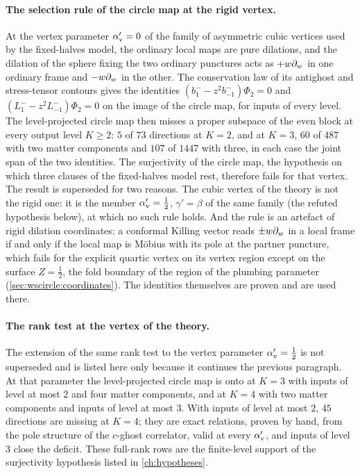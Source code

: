 \paragraph{The selection rule of the circle map at the rigid vertex.}
At the vertex parameter $\alpha'_{\rm v} = 0$ of the family of asymmetric cubic vertices used by the fixed-halves model, the ordinary local maps are pure dilations, and the dilation of the sphere fixing the two ordinary punctures acts as $+ w \partial_w$ in one ordinary frame and $- w \partial_w$ in the other.
The conservation law of its antighost and stress-tensor contours gives the identities $(b_1^- - z^2 b_{-1}^-) \Phi_2 = 0$ and $(L_1^- - z^2 L_{-1}^-) \Phi_2 = 0$ on the image of the circle map, for inputs of every level.
The level-projected circle map then misses a proper subspace of the even block at every output level $K \ge 2$: $5$ of $73$ directions at $K = 2$, and at $K = 3$, $60$ of $487$ with two matter components and $107$ of $1447$ with three, in each case the joint span of the two identities.
The surjectivity of the circle map, the hypothesis on which three clauses of the fixed-halves model rest, therefore fails for that vertex.
The result is superseded for two reasons.
The cubic vertex of the theory is not the rigid one: it is the member $\alpha'_{\rm v} = \tfrac{1}{2}$, $\gamma' = \beta$ of the same family (the refuted hypothesis below), at which no such rule holds.
And the rule is an artefact of rigid dilation coordinates: a conformal Killing vector reads $\pm w \partial_w$ in a local frame if and only if the local map is Möbius with its pole at the partner puncture, which fails for the explicit quartic vertex on its vertex region except on the surface $Z = \tfrac{1}{2}$, the fold boundary of the region of the plumbing parameter (\cref{sec:wscircle:coordinates}).
The identities themselves are proven and are used there.

\paragraph{The rank test at the vertex of the theory.}
The extension of the same rank test to the vertex parameter $\alpha'_{\rm v} = \tfrac{1}{2}$ is not superseded and is listed here only because it continues the previous paragraph.
At that parameter the level-projected circle map is onto at $K = 3$ with inputs of level at most $2$ and four matter components, and at $K = 4$ with two matter components and inputs of level at most $3$.
With inputs of level at most $2$, $45$ directions are missing at $K = 4$; they are exact relations, proven by hand, from the pole structure of the $c$-ghost correlator, valid at every $\alpha'_{\rm v}$, and inputs of level $3$ close the deficit.
These full-rank rows are the finite-level support of the surjectivity hypothesis listed in \cref{ch:hypotheses}.

